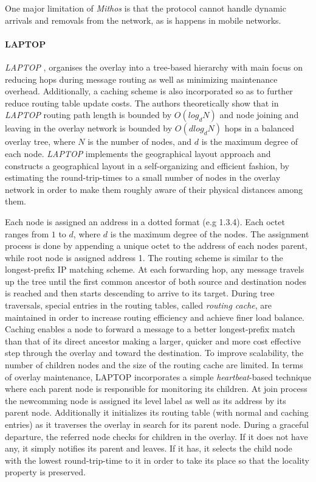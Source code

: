 One major limitation of \textit{Mithos} is that the protocol cannot handle
dynamic arrivals and removals from the network, as is happens in mobile
networks.

\paragraph*{\bf LAPTOP}
\emph{LAPTOP} \cite{wu_laptop_2007},  organises the overlay into a tree-based
hierarchy with main focus on reducing hops during message routing as well as
minimizing maintenance overhead. Additionally, a caching scheme is also
incorporated so as to further reduce routing table update costs. The authors
theoretically show that in \textit{LAPTOP} routing path length is bounded by
$O(log_d N)$ and node joining and leaving in the overlay network is bounded by
$O\left( d log_d N \right)$ hops in a balanced overlay tree, where $N$ is the
number of nodes, and $d$ is the maximum degree of each node. \textit{LAPTOP}
implements the geographical layout approach  and constructs a geographical
layout in a self-organizing and efficient fashion, by estimating the
round-trip-times to a small number of nodes in the overlay network in order to
make them roughly aware of their physical distances among them.

Each node is assigned an address in a dotted format (e.g 1.3.4). Each octet
ranges from $1$ to $d$, where $d$ is the maximum degree of the nodes. The
assignment process is done by appending a unique octet to the address of each
nodes
parent, while root node is assigned address 1.  The routing scheme is similar to
the longest-prefix IP matching scheme. At each forwarding hop, any message
travels up the tree until the first common ancestor of both source and
destination nodes is reached and then starts descending to arrive to its target.
During tree traversals, special entries in the routing tables, called
\emph{routing cache}, are maintained in order to increase routing efficiency and
achieve finer load balance. Caching enables a node to forward a message to a
better longest-prefix match than that of its direct ancestor making a larger,
quicker and more cost effective step through the overlay and toward the
destination. To improve scalability, the number of children nodes and the size
of the routing cache are limited.  In terms of overlay maintenance, LAPTOP
incorporates a simple \emph{heartbeat}-based technique where each parent node is
responsible for monitoring its children.  At join process the newcomming node is
assigned its level label as well as its address by its parent node. Additionally
it initializes its routing table (with normal and caching entries) as it
traverses the overlay in search for its parent node.  During a graceful
departure, the referred node checks for children in the overlay. If it does not
have any, it simply notifies its parent and leaves. If it has, it selects the
child node with the lowest round-trip-time to it in order to take its place so
that the locality property is preserved.

